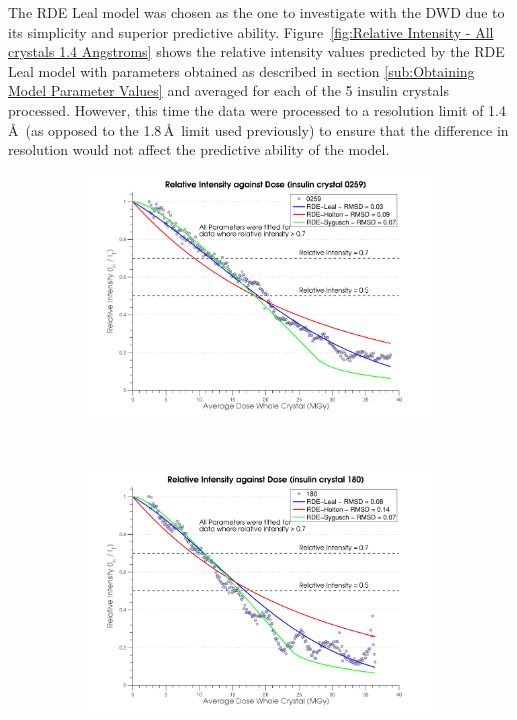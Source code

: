 The RDE Leal model was chosen as the one to investigate with the DWD due to its simplicity and superior predictive ability.
Figure~\ref{fig:Relative Intensity - All crystals 1.4 Angstroms} shows the relative intensity values predicted by the RDE Leal model with parameters obtained as described in section \ref{sub:Obtaining Model Parameter Values} and averaged for each of the 5 insulin crystals processed.
However, this time the data were processed to a resolution limit of 1.4\,\AA\ (as opposed to the 1.8$\,$\AA\ limit used previously) to ensure that the difference in resolution would not affect the predictive ability of the model.
\begin{figure}[H]
    \centering
    \begin{subfigure}[b]{1\textwidth}
        \centering
        \includegraphics[width=\textwidth]{figures/dwd/relintplot0259.pdf}
        \caption{}
        \label{Relative Intensity Plots - 0259}
    \end{subfigure}
			\\
    \begin{subfigure}[b]{1\textwidth}
        \centering
        \includegraphics[width=\textwidth]{figures/dwd/relintplot180.pdf}
        \caption{}
        \label{Relative Intensity Plots - 180}
    \end{subfigure}
\end{figure}
